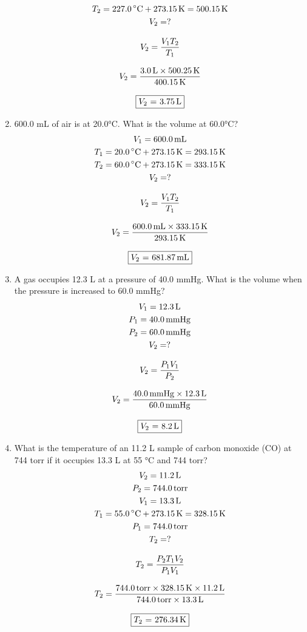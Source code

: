 \documentclass[12pt, a4paper]{article}
\begin{document}
\begin{enumerate}
\begin{gather*}
		T_2 = \SI{227.0}{\celsius}+ \SI{273.15}{\kelvin} = \SI{500.15}{\kelvin}\\
		V_2 = ?\\[3mm]
		V_2 =  \dfrac{V_1 T_2}{T_1}\\[3mm]
		V_2 = \dfrac{\SI{3.0}{\l} \times \SI{500.25}{\kelvin}}{\SI{400.15}{\kelvin}}\\[3mm]
		\fbox{$V_2$ = \SI{3.75}{\l}}
		\end{gather*}
	\item 600.0 mL of air is at 20.0°C. What is the volume at 60.0°C?
		\begin{gather*}
		V_1 = \SI{600.0}{\ml}\\
		T_1 = \SI{20.0}{\celsius} + \SI{273.15}{\kelvin} = \SI{293.15}{\kelvin}\\
		T_2 = \SI{60.0}{\celsius} + \SI{273.15}{\kelvin} = \SI{333.15}{\kelvin}\\
		V_2 = ?\\[3mm]
		V_2 =  \dfrac{V_1 T_2}{T_1}\\[3mm]
		V_2 = \dfrac{\SI{600.0}{\ml} \times \SI{333.15}{\kelvin}}{\SI{293.15}{\kelvin}}\\[3mm]
		\fbox{$V_2$ = \SI{681.87}{\ml}}
		\end{gather*}
	\item A gas occupies 12.3 L at a pressure of 40.0 mmHg. What is the volume when the pressure is increased to 60.0 mmHg?
		\begin{gather*}
		V_1 = \SI{12.3}{\l}\\
		P_1 = \SI{40.0}{\mmHg}\\
		P_2 = \SI{60.0}{\mmHg}\\
		V_2 = ?\\[3mm]
		V_2 = \dfrac{P_1 V_1}{P_2}\\[3mm]
		V_2 = \dfrac{\SI{40.0}{\mmHg} \times \SI{12.3}{\l}}{\SI{60.0}{\mmHg}}\\[3mm]
		\fbox{$V_2$ = \SI{8.2}{\l}}
		\end{gather*}

		\newpage

	\item What is the temperature of an 11.2 L sample of carbon monoxide (CO) at 744 torr if it occupies 13.3 L at 55 °C and 744 torr? 
		\begin{gather*}
		V_2 = \SI{11.2}{\l}\\
		P_2 = \SI{744.0}{torr}\\
		V_1 = \SI{13.3}{\l}\\
		T_1 = \SI{55.0}{\celsius} + \SI{273.15}{\kelvin} = \SI{328.15}{\kelvin}\\
		P_1 = \SI{744.0}{torr}\\
		T_2 = ?\\[3mm]
		T_2 = \dfrac{P_2 T_1 V_2}{P_1 V_1}\\[3mm]
		T_2 = \dfrac{\SI{744.0}{torr} \times \SI{328.15}{\kelvin} \times \SI{11.2}{\l}}{\SI{744.0}{torr} \times \SI{13.3}{\l}}\\[3mm]
		\fbox{$T_2$ = \SI{276.34}{\kelvin}}
		\end{gather*}
	\end{enumerate}
\end{document}

